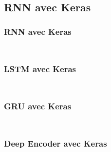 \subsection{RNN avec Keras}



\begin{frame}
  \frametitle{RNN avec Keras}
  \inputminted[linenos,fontsize=\small,bgcolor=pythonbg]{python}{code/tf-keras-rnn.py}
  \inputminted[linenos,fontsize=\small,bgcolor=returnbg]{python}{code/tf-keras-rnn.txt}
\end{frame}

\begin{frame}
  \frametitle{LSTM avec Keras}
  \inputminted[linenos,fontsize=\small,bgcolor=pythonbg]{python}{code/tf-keras-lstm.py}
  \inputminted[linenos,fontsize=\small,bgcolor=returnbg]{python}{code/tf-keras-lstm.txt}
\end{frame}

\begin{frame}
  \frametitle{GRU avec Keras}
  \inputminted[linenos,fontsize=\small,bgcolor=pythonbg]{python}{code/tf-keras-gru.py}
  \inputminted[linenos,fontsize=\small,bgcolor=returnbg]{python}{code/tf-keras-gru.txt}
\end{frame}

\begin{frame}
  \frametitle{Deep Encoder avec Keras}
  \inputminted[linenos,fontsize=\small,bgcolor=pythonbg]{python}{code/tf-keras-rnn-all-timestep.py}
  \inputminted[linenos,fontsize=\small,bgcolor=returnbg]{python}{code/tf-keras-rnn-all-timestep.txt}
\end{frame}

